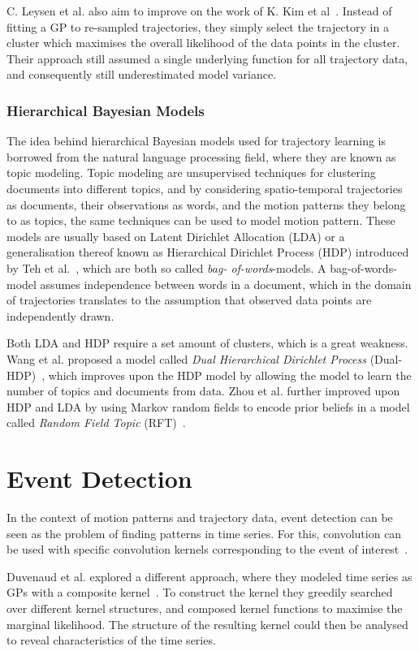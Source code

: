 C. Leysen et al. also aim to improve on the work of K. Kim et
al~\cite{Leysen2016Sep}. Instead of fitting a GP to re-sampled trajectories, 
they simply select the trajectory in a cluster which maximises the overall
likelihood of the data points in the cluster. Their approach still
assumed a single underlying function for all trajectory data,
and consequently still underestimated model variance.

\subsubsection{Hierarchical Bayesian Models}
The idea behind hierarchical Bayesian models used for trajectory
learning is borrowed from the natural language processing field, where
they are known as topic modeling. Topic modeling are unsupervised
techniques for clustering documents into different topics, and by 
considering spatio-temporal trajectories as documents,
their observations as words, and the motion patterns they belong to as
topics, the same techniques can be used to model motion pattern.  
These models are usually based on Latent Dirichlet Allocation (LDA) or
a generalisation thereof known as Hierarchical Dirichlet Process (HDP)
introduced by Teh et al.~\cite{teh2005sharing}, which are both so called \textit{bag-
of-words}-models. A bag-of-words-model assumes independence between
words in a document, which in the domain of trajectories translates to the
assumption that observed data points are independently drawn.

Both LDA and HDP require a set amount of clusters, which is a great
weakness. Wang et al. proposed a model called \textit{Dual Hierarchical Dirichlet
Process} (Dual-HDP)~\cite{Wang2008Jun}, which improves upon the HDP model
by allowing the model to learn the number of topics and documents from
data. Zhou et al. further improved upon HDP and LDA by using Markov random
fields to encode prior beliefs in a model called \textit{Random Field
  Topic} (RFT)~\cite{Zhou2011Jun}.

\section{Event Detection}
In the context of motion patterns and trajectory data, event detection
can be seen as the problem of finding patterns in time
series. For this, convolution can be used with specific convolution
kernels corresponding to the event of interest~\cite{smith1997scientist}.

Duvenaud et al. explored a different approach, where they modeled
time series as GPs with a composite kernel~\cite{duvenaud2013structure}. To construct the
kernel they greedily searched over different kernel structures,
and composed kernel functions to maximise the marginal likelihood.
The structure of the resulting kernel could then be analysed to reveal
characteristics of the time series.
